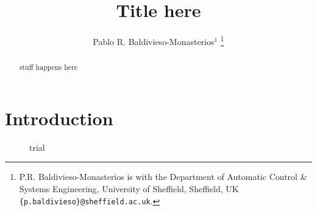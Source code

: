 \documentclass[letterpaper, 10 pt, conference]{ieeeconf}
\title{Title here}
\author{Pablo R. Baldivieso-Monasterios$^{1}$
\thanks{P.R. Baldivieso-Monasterios is with the Department of Automatic Control \& Systems Engineering, University of Sheffield, Sheffield, UK {\tt\small \{p.baldivieso\}@sheffield.ac.uk}.}
}
\begin{document}
\maketitle
\begin{abstract}            
stuff happens here
\end{abstract}
%

\section{Introduction}
\label{sec:introduction}

\cite{Limon2009}

\begin{figure}[b!]
  \centering
  
  \caption{trial}
  \label{fig:trial}
\end{figure}


\end{document}
